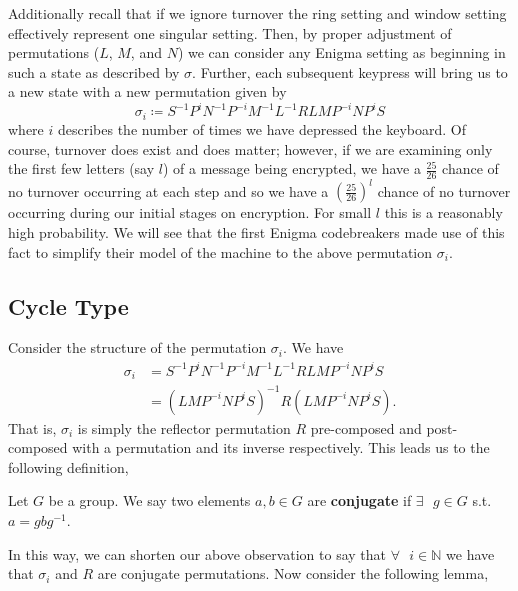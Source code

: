 Additionally recall that if we ignore turnover the ring setting and
window setting effectively represent one singular setting.
Then, by proper adjustment of permutations ($L$, $M$, and $N$) we can
consider any Enigma setting as beginning in such a state as described
by $\sigma$. Further, each subsequent keypress will bring us to a new
state with a new permutation given by
\[
  \sigma_i \coloneq S^{-1}P^{i}N^{-1}P^{-i}M^{-1}L^{-1}RLMP^{-i}NP^{i}S
\]
where $i$ describes the number of times we have depressed the
keyboard. Of course, turnover does exist and does matter; however, if
we are examining only the first few letters (say $l$) of a message
being encrypted, we have a $\frac{25}{26}$ chance of no turnover
occurring at each step and so we have a $(\frac{25}{26})^l$ chance of
no turnover occurring during our initial stages on encryption. For
small $l$ this is a reasonably high probability. We will see that the
first Enigma codebreakers made use of this
fact to simplify their model of the machine to the above permutation $\sigma_i$.

\subsection{Cycle Type}
Consider the structure of the permutation $\sigma_i$. We have
\begin{align*}
  \sigma_i & = S^{-1}P^{i}N^{-1}P^{-i}M^{-1}L^{-1}RLMP^{-i}NP^{i}S \\
  & = (LMP^{-i}NP^{i}S)^{-1}R(LMP^{-i}NP^{i}S).
\end{align*}
That is, $\sigma_i$ is simply the reflector permutation $R$
pre-composed and post-composed with a permutation and its inverse
respectively. This leads us to the following definition,

\begin{definition}
  Let $G$ be a group. We say two elements $a,b\in{G}$ are
  {\bf{conjugate}} if $\exists\text{ }g\in{G}$ s.t. $a=gbg^{-1}$.
\end{definition}
In this way, we can shorten our above observation to say that
$\forall\text{ }i\in\mathbb{N}$ we have that $\sigma_i$ and $R$ are
conjugate permutations. Now consider the following lemma,

